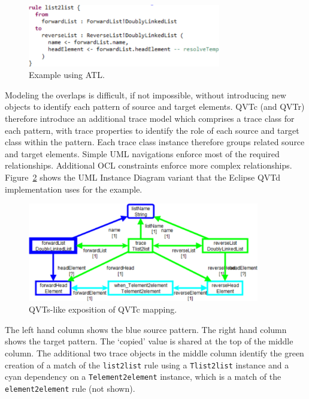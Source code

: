 \documentclass{llncs}
\begin{document}
\begin{figure}[h]
	\centering
	\includegraphics[width=0.75\textwidth]{atl.png}
	\caption{Example using ATL.}
	\label{fig:atl}
\end{figure}

 Modeling the overlaps is difficult, if not impossible, without introducing new objects to identify each pattern of source and target elements. QVTc (and QVTr) therefore introduce an additional trace model which comprises a trace class for each pattern, with trace properties to identify the role of each source and target class within the pattern. Each trace class instance therefore groups related source and target elements. Simple UML navigations enforce most of the required relationships. Additional OCL constraints enforce more complex relationships. Figure~\ref{fig:qvtc-qvts} shows the UML Instance Diagram variant that the Eclipse QVTd implementation uses for the example. 

\begin{figure}[h]
	\centering
	\includegraphics[width=0.9\textwidth]{qvtc-qvts.png}
	\caption{QVTs-like exposition of QVTc mapping.}
	\label{fig:qvtc-qvts}
\end{figure}

The left hand column shows the blue source pattern. The right hand column shows the target pattern. The `copied' value is shared at the top of the middle column. The additional two trace objects in the middle column identify the green creation of a match of the \texttt{list2list} rule using a \texttt{Tlist2list} instance and a cyan dependency on a \texttt{Telement2element} instance, which is  a match of the \texttt{element2element} rule (not  shown).
\end{document}
